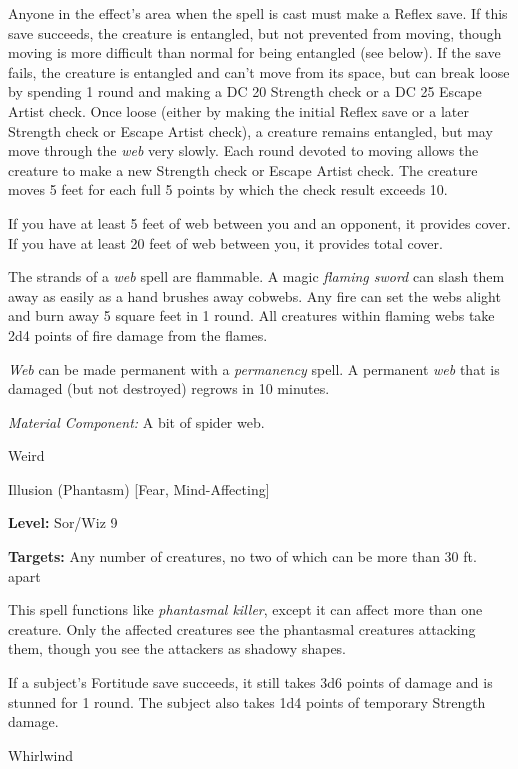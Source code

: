 \documentclass{article}
\begin{document}
Anyone in the effect's area when the spell is cast must make a Reflex save. If 
this save succeeds, the creature is entangled, but not prevented from moving, though 
moving is more difficult than normal for being entangled (see below). If the save 
fails, the creature is entangled and can't move from its space, but can break loose 
by spending 1 round and making a DC 20 Strength check or a DC 25 Escape Artist 
check. Once loose (either by making the initial Reflex save or a later Strength 
check or Escape Artist check), a creature remains entangled, but may move through 
the \textit{web }very slowly. Each round devoted to moving allows the creature 
to make a new Strength check or Escape Artist check. The creature moves 5 feet 
for each full 5 points by which the check result exceeds 10.

If you have at least 5 feet of web between you and an opponent, it provides cover. 
If you have at least 20 feet of web between you, it provides total cover.

The strands of a \textit{web }spell are flammable. A magic \textit{flaming sword 
}can slash them away as easily as a hand brushes away cobwebs. Any fire can set 
the webs alight and burn away 5 square feet in 1 round. All creatures within flaming 
webs take 2d4 points of fire damage from the flames.

\textit{Web }can be made permanent with a \textit{permanency }spell. A permanent 
\textit{web }that is damaged (but not destroyed) regrows in 10 minutes.

\textit{Material Component: }A bit of spider web.

\vspace{12pt}
Weird

Illusion (Phantasm) [Fear, Mind-Affecting]

\textbf{Level:} Sor/Wiz 9

\textbf{Targets:} Any number of creatures, no two of which can be more than 30 
ft. apart

This spell functions like \textit{phantasmal killer}, except it can affect more 
than one creature. Only the affected creatures see the phantasmal creatures attacking 
them, though you see the attackers as shadowy shapes.

If a subject's Fortitude save succeeds, it still takes 3d6 points of damage and 
is stunned for 1 round. The subject also takes 1d4 points of temporary Strength 
damage.

\vspace{12pt}
Whirlwind
\end{document}
